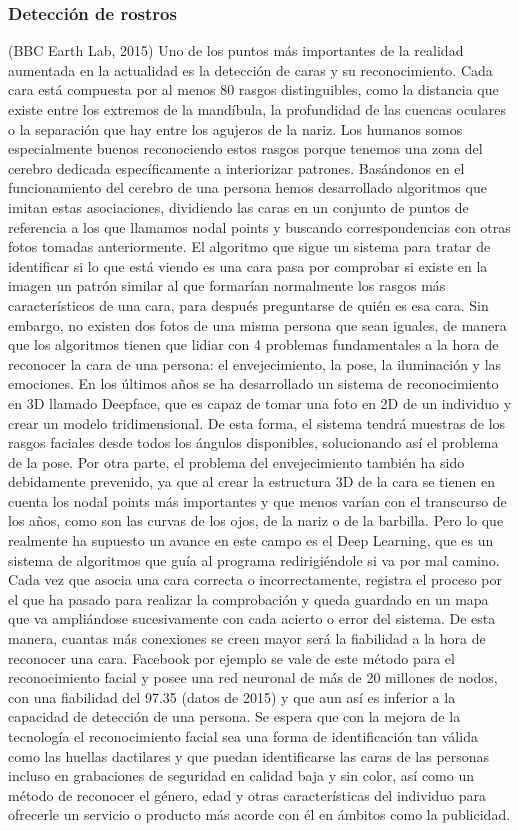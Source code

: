 \subsubsection{Detección de rostros}
(BBC Earth Lab, 2015)
Uno de los puntos más importantes de la realidad aumentada en la actualidad es la detección de caras y su reconocimiento.
Cada cara está compuesta por al menos 80 rasgos distinguibles, como la distancia que existe entre los extremos de la mandíbula, la profundidad de las cuencas oculares o la separación que hay entre los agujeros de la nariz. Los humanos somos especialmente buenos reconociendo estos rasgos porque tenemos una zona del cerebro dedicada específicamente a interiorizar patrones.
Basándonos en el funcionamiento del cerebro de una persona hemos desarrollado algoritmos que imitan estas asociaciones, dividiendo las caras en un conjunto de puntos de referencia a los que llamamos nodal points y buscando correspondencias con otras fotos tomadas anteriormente. El algoritmo que sigue un sistema para tratar de identificar si lo que está viendo es una cara pasa por comprobar si existe en la imagen un patrón similar al que formarían normalmente los rasgos más característicos de una cara, para después preguntarse de quién es esa cara. Sin embargo, no existen dos fotos de una misma persona que sean iguales, de manera que los algoritmos tienen que lidiar con 4 problemas fundamentales a la hora de reconocer la cara de una persona: el envejecimiento, la pose, la iluminación y las emociones.
En los últimos años se ha desarrollado un sistema de reconocimiento en 3D llamado Deepface, que es capaz de tomar una foto en 2D de un individuo y crear un modelo tridimensional. De esta forma, el sistema tendrá muestras de los rasgos faciales desde todos los ángulos disponibles, solucionando así el problema de la pose.
Por otra parte, el problema del envejecimiento también ha sido debidamente prevenido, ya que al crear la estructura 3D de la cara se tienen en cuenta los nodal points más importantes y que menos varían con el transcurso de los años, como son las curvas de los ojos, de la nariz o de la barbilla. Pero lo que realmente ha supuesto un avance en este campo es el Deep Learning, que es un sistema de algoritmos que guía al programa redirigiéndole si va por mal camino. Cada vez que asocia una cara correcta o incorrectamente, registra el proceso por el que ha pasado para realizar la comprobación y queda guardado en un mapa que va ampliándose sucesivamente con cada acierto o error del sistema. De esta manera, cuantas más conexiones se creen mayor será la fiabilidad a la hora de reconocer una cara.
Facebook por ejemplo se vale de este método para el reconocimiento facial y posee una red neuronal de más de 20 millones de nodos, con una fiabilidad del 97.35 (datos de 2015) y que aun así es inferior a la capacidad de detección de una persona.
Se espera que con la mejora de la tecnología el reconocimiento facial sea una forma de identificación tan válida como las huellas dactilares y que puedan identificarse las caras de las personas incluso en grabaciones de seguridad en calidad baja y sin color, así como un método de reconocer el género, edad y otras características del individuo para ofrecerle un servicio o producto más acorde con él en ámbitos como la publicidad.
 
